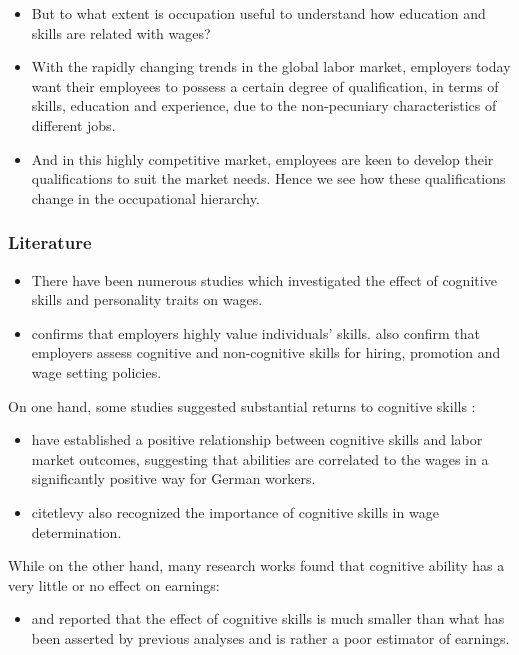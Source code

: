 \documentclass[11pt]{beamer}
\begin{document}
\begin{frame}[t]
	\begin{itemize}
		\item But to what extent is occupation useful to understand how education
and skills are related with wages?

		\item With the rapidly changing trends in the global labor market,
employers today want their employees to possess a certain degree of
qualification, in terms of skills, education and experience, due to the
non-pecuniary characteristics of different jobs.

		\item And in this highly competitive market, employees are keen to develop
their qualifications to suit the market needs. Hence we see how these
qualifications change in the occupational hierarchy.
 	\end{itemize}
\end{frame}

\begin{frame}[t]
    \frametitle{Literature}
    \begin{itemize}
   	 \item There have been numerous studies which investigated the effect of
cognitive skills and personality traits on wages.
  	 \item \citet{heineck} confirms that employers highly value
individuals’ skills. \citet{farkas} also confirm that
employers assess cognitive and non-cognitive skills for hiring,
promotion and wage setting policies.
      
     \end{itemize}
    \note{~}
\end{frame}


\begin{frame}[t]
      On one hand, some studies suggested substantial returns to
cognitive skills :
	 \begin{itemize}
		\item \citet{heineck} have established a positive
relationship between cognitive skills and labor market outcomes,
suggesting that abilities are correlated to the wages in a significantly
positive way for German workers.

		\item citet{levy} also recognized the importance of
cognitive skills in wage determination.
	\end{itemize}
	
While on the other hand, many research works found that cognitive
ability has a very little or no effect on earnings:
	\begin{itemize}
\item \citet{heckman} and \citet{zax} reported
that the effect of cognitive skills is much smaller than what has been
asserted by previous analyses and is rather a poor estimator of
earnings.
	\end{itemize}
         \note{~}
\end{frame}
\end{document}
